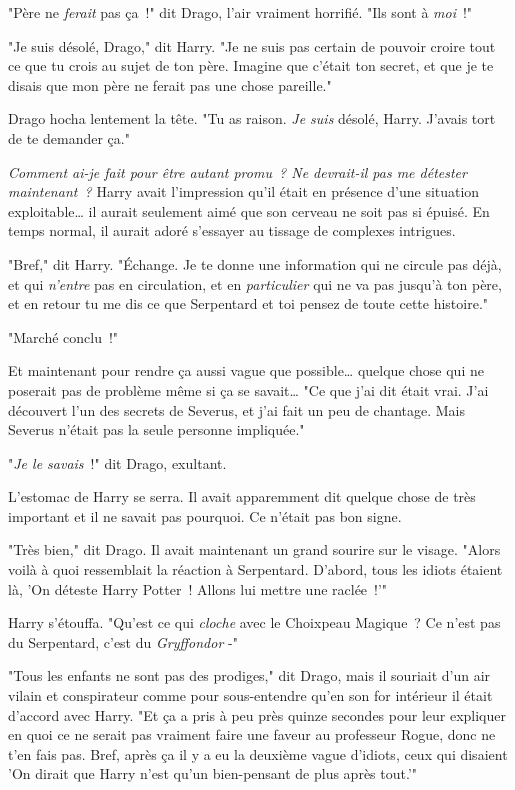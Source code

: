 "Père ne \emph{ferait} pas ça~!" dit Drago, l'air vraiment horrifié. "Ils sont à \emph{moi}~!"

"Je suis désolé, Drago," dit Harry. "Je ne suis pas certain de pouvoir croire tout ce que tu crois au sujet de ton père. Imagine que c'était ton secret, et que je te disais que mon père ne ferait pas une chose pareille."

Drago hocha lentement la tête. "Tu as raison. \emph{Je suis} désolé, Harry. J'avais tort de te demander ça."

\emph{Comment ai-je fait pour être autant promu~? Ne devrait-il pas me détester maintenant~?} Harry avait l'impression qu'il était en présence d'une situation exploitable… il aurait seulement aimé que son cerveau ne soit pas si épuisé. En temps normal, il aurait adoré s'essayer au tissage de complexes intrigues.

"Bref," dit Harry. "Échange. Je te donne une information qui ne circule pas déjà, et qui \emph{n'entre} pas en circulation, et en \emph{particulier} qui ne va pas jusqu'à ton père, et en retour tu me dis ce que Serpentard et toi pensez de toute cette histoire."

"Marché conclu~!"

Et maintenant pour rendre ça aussi vague que possible… quelque chose qui ne poserait pas de problème même si ça se savait… "Ce que j'ai dit était vrai. J'ai découvert l'un des secrets de Severus, et j'ai fait un peu de chantage. Mais Severus n'était pas la seule personne impliquée."

"\emph{Je le savais}~!" dit Drago, exultant.

L'estomac de Harry se serra. Il avait apparemment dit quelque chose de très important et il ne savait pas pourquoi. Ce n'était pas bon signe.

"Très bien," dit Drago. Il avait maintenant un grand sourire sur le visage. "Alors voilà à quoi ressemblait la réaction à Serpentard. D'abord, tous les idiots étaient là, 'On déteste Harry Potter~! Allons lui mettre une raclée~!'"

Harry s'étouffa. "Qu'est ce qui \emph{cloche} avec le Choixpeau Magique~? Ce n'est pas du Serpentard, c'est du \emph{Gryffondor} -"

"Tous les enfants ne sont pas des prodiges," dit Drago, mais il souriait d'un air vilain et conspirateur comme pour sous-entendre qu'en son for intérieur il était d'accord avec Harry. "Et ça a pris à peu près quinze secondes pour leur expliquer en quoi ce ne serait pas vraiment faire une faveur au professeur Rogue, donc ne t'en fais pas. Bref, après ça il y a eu la deuxième vague d'idiots, ceux qui disaient 'On dirait que Harry n'est qu'un bien-pensant de plus après tout.'"

